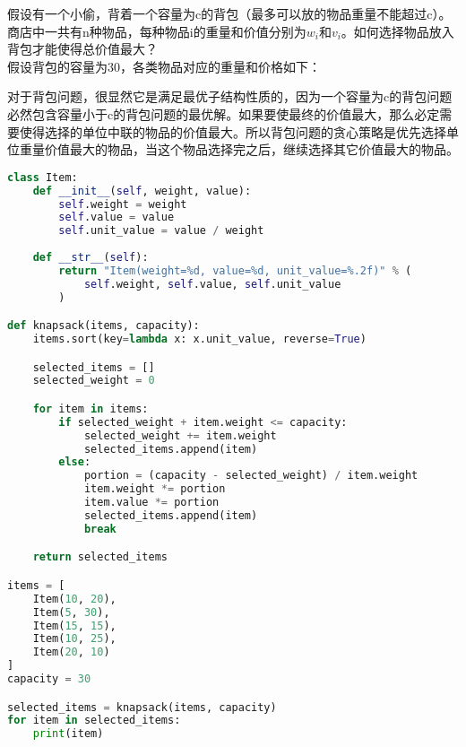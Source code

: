 假设有一个小偷，背着一个容量为c的背包（最多可以放的物品重量不能超过c）。商店中一共有n种物品，每种物品i的重量和价值分别为$ w_i $和$ v_i $。如何选择物品放入背包才能使得总价值最大？\\

假设背包的容量为30，各类物品对应的重量和价格如下：

\begin{table}[H]
	\centering
	\caption{物品信息}
\end{table}

对于背包问题，很显然它是满足最优子结构性质的，因为一个容量为c的背包问题必然包含容量小于c的背包问题的最优解。如果要使最终的价值最大，那么必定需要使得选择的单位中联的物品的价值最大。所以背包问题的贪心策略是优先选择单位重量价值最大的物品，当这个物品选择完之后，继续选择其它价值最大的物品。\\


\begin{lstlisting}[language=Python]
class Item:
    def __init__(self, weight, value):
        self.weight = weight
        self.value = value
        self.unit_value = value / weight
    
    def __str__(self):
        return "Item(weight=%d, value=%d, unit_value=%.2f)" % (
            self.weight, self.value, self.unit_value
        )

def knapsack(items, capacity):
    items.sort(key=lambda x: x.unit_value, reverse=True)

    selected_items = []
    selected_weight = 0

    for item in items:
        if selected_weight + item.weight <= capacity:
            selected_weight += item.weight
            selected_items.append(item)
        else:
            portion = (capacity - selected_weight) / item.weight
            item.weight *= portion
            item.value *= portion
            selected_items.append(item)
            break

    return selected_items

items = [
    Item(10, 20),
    Item(5, 30), 
    Item(15, 15),
    Item(10, 25),
    Item(20, 10)
]
capacity = 30

selected_items = knapsack(items, capacity)
for item in selected_items:
    print(item)
\end{lstlisting}

